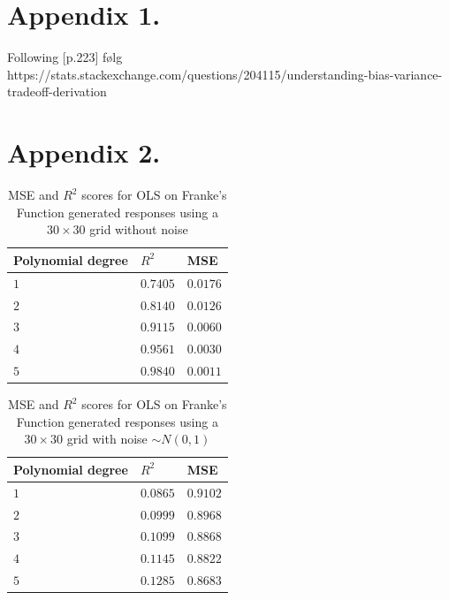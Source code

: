 \documentclass[%
oneside,                 %
final,                   %
10pt]{article}
\begin{document}



\begin{appendices}
\section*{Appendix 1.} \label{APP_1}
Following \citep{HastieTrevor2009TEoS}[p.223]
følg https://stats.stackexchange.com/questions/204115/understanding-bias-variance-tradeoff-derivation

\section*{Appendix 2.} \label{APP_2}
\begin{table}[h!]
\begin{center}
\begin{tabular}{lll}
\hline
 Polynomial degree   & $R^2$      & MSE        \\
\hline
 $ 1 $               & $ 0.7405 $ & $ 0.0176 $ \\
 $ 2 $               & $ 0.8140 $ & $ 0.0126 $ \\
 $ 3 $               & $ 0.9115 $ & $ 0.0060 $ \\
 $ 4 $               & $ 0.9561 $ & $ 0.0030 $ \\
 $ 5 $               & $ 0.9840 $ & $ 0.0011 $ \\
\hline
\end{tabular}
\end{center}
\caption{MSE and $R^2$ scores for OLS on  Franke's Function generated responses using a $30\times 30$ grid without noise}
\label{table:OLS_mse_r2}
\end{table}

\begin{table}[h!]
\begin{center}
\begin{tabular}{lll}
\hline
 Polynomial degree   & $R^2$      & MSE        \\
\hline
 $ 1 $               & $ 0.0865 $ & $ 0.9102 $ \\
 $ 2 $               & $ 0.0999 $ & $ 0.8968 $ \\
 $ 3 $               & $ 0.1099 $ & $ 0.8868 $ \\
 $ 4 $               & $ 0.1145 $ & $ 0.8822 $ \\
 $ 5 $               & $ 0.1285 $ & $ 0.8683 $ \\
\hline
\end{tabular}
\end{center}
\caption{MSE and $R^2$ scores for OLS on  Franke's Function generated responses using a $30\times 30$ grid with noise $\sim N(0,1)$ }
\label{table:OLS_mse_r2}
\end{table}

\end{appendices}
\end{document}
